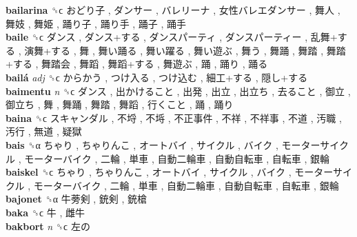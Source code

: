 \textbf{bailarina} ␝ϲ   おどり子 ,  ダンサー ,  バレリーナ ,  女性バレエダンサー ,  舞人 ,  舞妓 ,  舞姫 ,  踊り子 ,  踊り手 ,  踊子 ,  踊手   \\
\textbf{baile} ␝ϲ   ダンス ,  ダンス+する ,  ダンスパーティ ,  ダンスパーティー ,  乱舞+する ,  演舞+する ,  舞 ,  舞い踊る ,  舞い躍る ,  舞い遊ぶ ,  舞う ,  舞踊 ,  舞踏 ,  舞踏+する ,  舞踏会 ,  舞蹈 ,  舞蹈+する ,  舞遊ぶ ,  踊 ,  踊り ,  踊る   \\
\textbf{bailá} \emph{adj}  ␝ϲ   からかう ,  つけ入る ,  つけ込む ,  細工+する ,  隠し+する   \\
\textbf{baimentu} \emph{n}  ␝ϲ   ダンス ,  出かけること ,  出発 ,  出立 ,  出立ち ,  去ること ,  御立 ,  御立ち ,  舞 ,  舞踊 ,  舞踏 ,  舞蹈 ,  行くこと ,  踊 ,  踊り   \\
\textbf{baina} ␝ϲ   スキャンダル ,  不埒 ,  不埓 ,  不正事件 ,  不祥 ,  不祥事 ,  不道 ,  汚職 ,  汚行 ,  無道 ,  疑獄   \\
\textbf{bais} ␝α   ちゃり ,  ちゃりんこ ,  オートバイ ,  サイクル ,  バイク ,  モーターサイクル ,  モーターバイク ,  二輪 ,  単車 ,  自動二輪車 ,  自動自転車 ,  自転車 ,  銀輪   \\
\textbf{baiskel} ␝ϲ   ちゃり ,  ちゃりんこ ,  オートバイ ,  サイクル ,  バイク ,  モーターサイクル ,  モーターバイク ,  二輪 ,  単車 ,  自動二輪車 ,  自動自転車 ,  自転車 ,  銀輪   \\
\textbf{bajonet} ␝α   牛蒡剣 ,  銃剣 ,  銃槍   \\
\textbf{baka} ␝ϲ   牛 ,  雌牛   \\
\textbf{bakbort} \emph{n}  ␝ϲ   左の   \\
